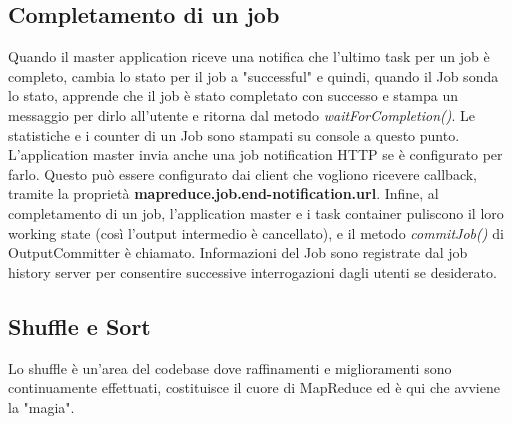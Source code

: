 \subsection{Completamento di un job}
Quando il master application riceve una notifica che l'ultimo task per un job è completo, cambia lo stato per il job a "successful" e quindi, quando il Job sonda lo stato, apprende che il job è stato completato con successo e stampa un messaggio per dirlo all'utente e ritorna dal metodo \textit{waitForCompletion()}. Le statistiche e i counter di un Job sono stampati su console a questo punto. L'application master invia anche una job notification HTTP se è configurato per farlo. Questo può essere configurato dai client che vogliono ricevere callback, tramite la proprietà \textbf{mapreduce.job.end-notification.url}. Infine, al completamento di un job, l'application master e i task container puliscono il loro working state (così l'output intermedio è cancellato), e il metodo \textit{commitJob()} di OutputCommitter è chiamato. Informazioni del Job sono registrate dal job history server per consentire successive interrogazioni dagli utenti se desiderato.
\subsection{Shuffle e Sort}
Lo shuffle è un'area del codebase dove raffinamenti e miglioramenti sono continuamente effettuati, costituisce il cuore di MapReduce ed è qui che avviene la "magia".
